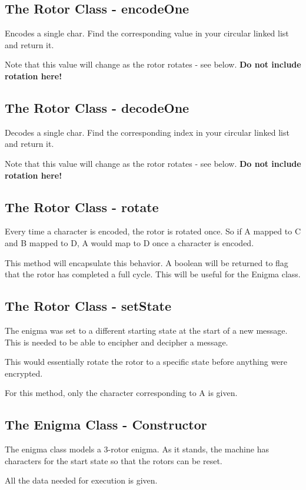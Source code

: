 \documentclass[11pt]{article}
\begin{document}
\subsection{The Rotor Class - encodeOne}
Encodes a single char. Find the corresponding value in your circular linked list and return it.

Note that this value will change as the rotor rotates - see below.
\textbf{Do not include rotation here!}

\subsection{The Rotor Class - decodeOne}
Decodes a single char. Find the corresponding index in your circular linked list and return it.

Note that this value will change as the rotor rotates - see below.
\textbf{Do not include rotation here!}

\subsection{The Rotor Class - rotate}
Every time a character is encoded, the rotor is rotated once. So if A mapped to C and B mapped to D, A would map to D once a character is encoded.

This method will encapsulate this behavior. A boolean will be returned to flag that the rotor has completed a full cycle.
This will be useful for the Enigma class.

\subsection{The Rotor Class - setState}
The enigma was set to a different starting state at the start of a new message.
This is needed to be able to encipher and decipher a message.

This would essentially rotate the rotor to a specific state before anything were encrypted.

For this method, only the character corresponding to A is given.

\subsection{The Enigma Class - Constructor}
The enigma class models a 3-rotor enigma. As it stands, the
machine has characters for the start state so that the rotors can be
reset.

All the data needed for execution is given.
\end{document}
